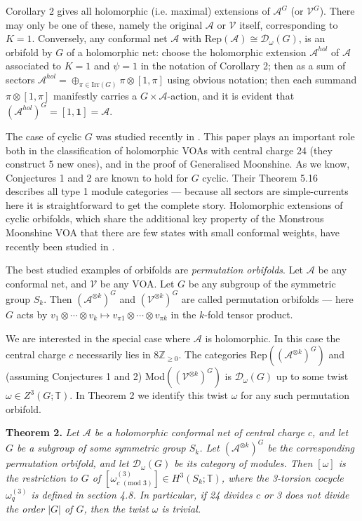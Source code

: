 \documentclass[12pt]{article}
\numberwithin{equation}{section}
\def\cA            {{\mathcal{A}}}
\def\cD            {{\mathcal{D}}}
\def\cV            {{\mathcal{V}}}
\def\bbT           {\mathbb{T}}
\def\bbZ           {\mathbb{Z}}
\begin{document}
  Corollary 2  gives all holomorphic (i.e. maximal) extensions of $\cA^G$ (or $\cV^G$). There may
  only be one of these, namely  the original  $\cA$ or $\cV$ itself, corresponding to $K=1$. Conversely, any conformal net $\cA$ with Rep$(\cA)\cong
\cD_\omega(G)$, is an orbifold by $G$ of a holomorphic net: choose the holomorphic extension $\cA^{hol}$
of $\cA$ associated to $K=1$ and $\psi= 1$ in the notation of Corollary 2; then as a sum of sectors $\cA^{hol}=\oplus_{\pi\in\mathrm{Irr}(G)}
\pi\otimes [1,\pi]$ using obvious notation; then each summand $\pi\otimes[1,\pi]$ manifestly carries a $G\times \cA$-action,
and it is evident that $(\cA^{hol})^G=[1,\mathbf{1}]=\cA$. 


The case of cyclic $G$ was studied recently in  \cite{EMS}. This paper plays an important role both in the classification of
holomorphic VOAs with central charge 24 (they construct 5 new ones), and in the proof of Generalised Moonshine. As we know,
Conjectures 1 and 2 are known to hold for $G$ cyclic. Their Theorem 5.16 describes all type 1 module categories --- because all sectors are simple-currents here it is straightforward to get
the complete story.
Holomorphic extensions of cyclic orbifolds, which share the additional key property of the Monstrous Moonshine VOA that there are few states with small conformal weights, have recently been studied in \cite{GK}.


The best studied examples of orbifolds are \textit{permutation orbifolds}. Let $\cA$ be any conformal net, and $\cV$ be any VOA. Let $G$ be any subgroup of the symmetric group $S_k$. Then $(\cA^{\otimes k})^G$ and $(\cV^{\otimes k})^G$ are called permutation orbifolds --- here $G$ acts by $v_1\otimes\cdots \otimes v_k\mapsto v_{\pi 1}\otimes\cdots \otimes v_{\pi k}$ in the $k$-fold tensor product. 

We are interested in the special case where $\cA$ is holomorphic.  In this case the central charge $c$ necessarily lies in $8\bbZ_{\ge 0}$. 
The categories Rep$((\cA^{\otimes k})^G)$ and (assuming Conjectures 1 and 2) Mod$((\cV^{\otimes k})^G)$
is $\cD_\omega(G)$ up to some twist $\omega\in Z^3(G;\bbT)$. In Theorem 2 we identify
this twist $\omega$ for any such permutation orbifold.


\medskip\noindent\textbf{Theorem 2.} \textit{Let $\cA$ be a holomorphic conformal net of central charge $c$, and let $G$ be a subgroup of some symmetric group $S_k$. Let $(\cA^{\otimes k})^G$ be the corresponding permutation orbifold, and let $\cD_\omega(G)$ be its category of modules. Then $[\omega]$ is the restriction to $G$ of $[\omega^{(3)}_{c\,\, (\mathrm{mod}\,\, 3)}]\in H^3(S_k;\bbT)$, where the 3-torsion cocycle $\omega^{(3)}_q$ is defined in section 4.8. In particular, if  24 divides $c$ or 3 does not divide the order $|G|$ of $G$, then the twist $\omega$ is trivial.}\medskip
\end{document}
